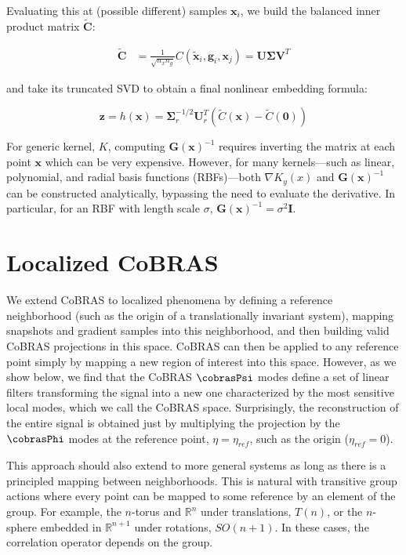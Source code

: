 \documentclass[twocolumn,10pt]{article}
\begin{document}
\noindent Evaluating this at (possible different) samples $\mathbf x_i$, we build the balanced inner product matrix $\mathbf{\tilde C}$:

\begin{align}
    \mathbf {\tilde C} 
        &= \frac{1}{\sqrt{n_x n_g}} C(\mathbf{\tilde x}_i, \mathbf{g}_i, \mathbf{x}_j)
        = \mathbf U \mathbf \Sigma \mathbf V^T
\end{align}

\noindent and take its truncated SVD to obtain a final nonlinear embedding formula: 

\begin{equation}
    \mathbf z = h(\mathbf x) = \mathbf{\Sigma}_r^{-1/2} \mathbf{U}_r^T 
    \left(
        \tilde C(\mathbf{x}) - \tilde C(\mathbf{0}) 
    \right)
\end{equation}

For generic kernel, $K$, computing $\mathbf G(\mathbf x)^{-1}$ requires inverting the matrix at each point $\mathbf x$ which can be very expensive. However, for many kernels---such as linear, polynomial, and radial basis functions (RBFs)---both $\nabla K_y(x)$ and $\mathbf G(\mathbf x)^{-1}$ can be constructed analytically, bypassing the need to evaluate the derivative. In particular, for an RBF with length scale $\sigma$, $\mathbf G(\mathbf x)^{-1} = \sigma^2 \mathbf{I}$. 


\section{Localized CoBRAS}
\label{si:localized}
We extend CoBRAS to localized phenomena by defining a reference neighborhood (such as the origin of a translationally invariant system), mapping snapshots and gradient samples into this neighborhood, and then building valid CoBRAS projections in this space. CoBRAS can then be applied to any reference point simply by mapping a new region of interest into this space. However, as we show below, we find that the CoBRAS $\cobrasPsi$ modes define a set of linear filters transforming the signal into a new one characterized by the most sensitive local modes, which we call the CoBRAS space. Surprisingly, the reconstruction of the entire signal is obtained just by multiplying the projection by the $\cobrasPhi$ modes at the reference point, $\eta = \eta_{ref}$, such as the origin ($\eta_{ref}=0$).

This approach should also extend to more general systems as long as there is a principled mapping between neighborhoods. This is natural with transitive group actions where every point can be mapped to some reference by an element of the group. For example, the $n$-torus and $\mathbb R^n$ under translations, $T(n)$,  or the $n$-sphere embedded in $\mathbb R^{n+1}$ under rotations, $SO(n+1)$. In these cases, the correlation operator depends on the group.
\end{document}
